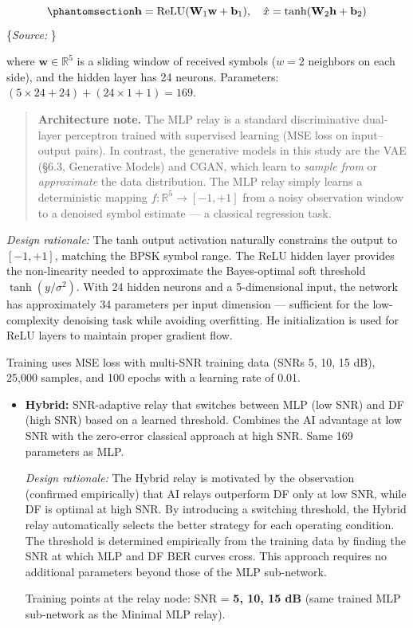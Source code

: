 \documentclass[
  english,
  12pt,
  12pt,
  a4paper,
  oneside]{report}
\begin{document}
\begin{equation}\protect\phantomsection\label{eq:mlp-relay}{\mathbf{h} = \text{ReLU}(\mathbf{W}_1 \mathbf{w} + \mathbf{b}_1), \quad \hat{x} = \tanh(\mathbf{W}_2 \mathbf{h} + \mathbf{b}_2)
}\end{equation} \footnotesize\{\textit{Source: \1}\}\normalsize

where \(\mathbf{w} \in \mathbb{R}^5\) is a sliding window of received symbols (\(w=2\) neighbors on each side), and the hidden layer has 24 neurons. Parameters: \((5 \times 24 + 24) + (24 \times 1 + 1) = 169\).

\begin{quote}
\textbf{Architecture note.} The MLP relay is a standard discriminative dual-layer perceptron trained with supervised learning (MSE loss on input--output pairs). In contrast, the generative models in this study are the VAE (§6.3, Generative Models) and CGAN, which learn to \emph{sample from} or \emph{approximate} the data distribution. The MLP relay simply learns a deterministic mapping \(f: \mathbb{R}^5 \to [-1,+1]\) from a noisy observation window to a denoised symbol estimate --- a classical regression task.
\end{quote}

\emph{Design rationale:} The tanh output activation naturally constrains the output to \([-1, +1]\), matching the BPSK symbol range. The ReLU hidden layer provides the non-linearity needed to approximate the Bayes-optimal soft threshold \(\tanh(y/\sigma^2)\). With 24 hidden neurons and a 5-dimensional input, the network has approximately 34 parameters per input dimension --- sufficient for the low-complexity denoising task while avoiding overfitting. He initialization is used for ReLU layers to maintain proper gradient flow.

Training uses MSE loss with multi-SNR training data (SNRs 5, 10, 15 dB), 25,000 samples, and 100 epochs with a learning rate of 0.01.

\begin{itemize}
\item
  \textbf{Hybrid:} SNR-adaptive relay that switches between MLP (low SNR) and DF (high SNR) based on a learned threshold. Combines the AI advantage at low SNR with the zero-error classical approach at high SNR. Same 169 parameters as MLP.

  \emph{Design rationale:} The Hybrid relay is motivated by the observation (confirmed empirically) that AI relays outperform DF only at low SNR, while DF is optimal at high SNR. By introducing a switching threshold, the Hybrid relay automatically selects the better strategy for each operating condition. The threshold is determined empirically from the training data by finding the SNR at which MLP and DF BER curves cross. This approach requires no additional parameters beyond those of the MLP sub-network.

  Training points at the relay node: SNR = \textbf{5, 10, 15 dB} (same trained MLP sub-network as the Minimal MLP relay).
\end{itemize}
\end{document}

